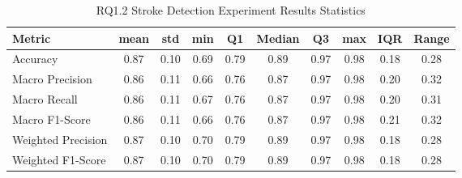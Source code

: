 \begin{table}[h]
\caption{RQ1.2 Stroke Detection Experiment Results Statistics}
\label{tab:rq1.2_Stroke_Detection_Results_Statistics}
\begin{tabular}{|l|c|c|c|c|c|c|c|c|c|}
\toprule
Metric & mean & std & min & Q1 & Median & Q3 & max & IQR & Range \\
\midrule
Accuracy & 0.87 & 0.10 & 0.69 & 0.79 & 0.89 & 0.97 & 0.98 & 0.18 & 0.28 \\
Macro Precision & 0.86 & 0.11 & 0.66 & 0.76 & 0.87 & 0.97 & 0.98 & 0.20 & 0.32 \\
Macro Recall & 0.86 & 0.11 & 0.67 & 0.76 & 0.87 & 0.97 & 0.98 & 0.20 & 0.31 \\
Macro F1-Score & 0.86 & 0.11 & 0.66 & 0.76 & 0.87 & 0.97 & 0.98 & 0.21 & 0.32 \\
Weighted Precision & 0.87 & 0.10 & 0.70 & 0.79 & 0.89 & 0.97 & 0.98 & 0.18 & 0.28 \\
Weighted F1-Score & 0.87 & 0.10 & 0.70 & 0.79 & 0.89 & 0.97 & 0.98 & 0.18 & 0.28 \\
\bottomrule
\end{tabular}
\end{table}